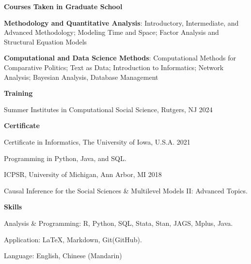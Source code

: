 \documentclass[10.5pt,]{article}
\providecommand{\tightlist}{%
	\setlength{\itemsep}{0pt}\setlength{\parskip}{0pt}}
\renewenvironment{itemize}{
	\begin{list}{}{
			\setlength{\leftmargin}{1.5em}
		}
	}{
	\end{list}
}
\begin{document}
\begin{itemize}
\tightlist
\item
  \textbf{Courses Taken in Graduate School}

  \begin{itemize}
  \tightlist
  \item
    \textbf{Methodology and Quantitative Analysis}: Introductory,
    Intermediate, and Advanced Methodology; Modeling Time and Space;
    Factor Analysis and Structural Equation Models
  \item
    \textbf{Computational and Data Science Methods}: Computational
    Methods for Comparative Politics; Text as Data; Introduction to
    Informatics; Network Analysis; Bayesian Analysis, Database
    Management
  \end{itemize}
\item
  \textbf{Training}

  \begin{itemize}
  \tightlist
  \item
    Summer Institutes in Computational Social Science, Rutgers, NJ
    \hfill2024
  \end{itemize}
\item
  \textbf{Certificate}

  \begin{itemize}
  \tightlist
  \item
    Certificate in Informatics, The University of Iowa, U.S.A.
    \hfill 2021

    \begin{itemize}
    \tightlist
    \item
      Programming in Python, Java, and SQL.
    \end{itemize}
  \item
    ICPSR, University of Michigan, Ann Arbor, MI \hfill 2018

    \begin{itemize}
    \tightlist
    \item
      Causal Inference for the Social Sciences \& Multilevel Models II:
      Advanced Topics.
    \end{itemize}
  \end{itemize}
\item
  \textbf{Skills}

  \begin{itemize}
  \tightlist
  \item
    Analysis \& Programming: R, Python, SQL, Stata, Stan, JAGS, Mplus,
    Java.
  \item
    Application: LaTeX, Markdown, Git(GitHub).
  \item
    Language: English, Chinese (Mandarin)
  \end{itemize}
\end{itemize}
\end{document}
